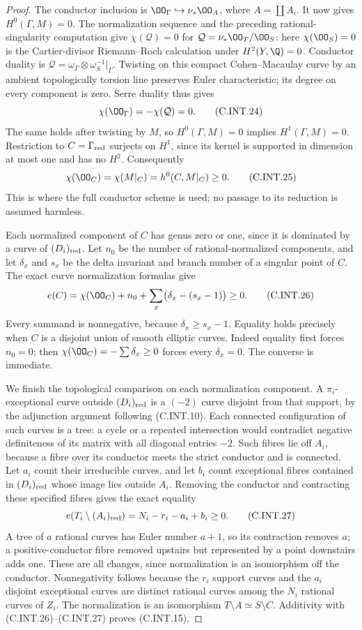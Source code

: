 \begin{proof}
The conductor inclusion is
$\OO_\Gamma\hookrightarrow\nu_*\OO_A$, where
$A=\coprod A_i$. It now gives $H^0(\Gamma,M)=0$.
The normalization sequence and the preceding
rational-singularity computation give
$\chi(\mathcal Q)=0$ for
$\mathcal Q=\nu_*\OO_T/\OO_S$: here
$\chi(\OO_S)=0$ is the Cartier-divisor
Riemann--Roch calculation under $H^2(Y,\Q)=0$.
Conductor duality is
$\mathcal Q=\omega_\Gamma\otimes\omega_S^{-1}|_\Gamma$.
Twisting on this compact Cohen--Macaulay curve by
an ambient topologically torsion line preserves
Euler characteristic; its degree on every
component is zero. Serre duality thus gives
\[
 \chi(\OO_\Gamma)=-\chi(\mathcal Q)=0.
 \tag{C.INT.24}
\]
The same holds after twisting by $M$, so
$H^0(\Gamma,M)=0$ implies $H^1(\Gamma,M)=0$.
Restriction to $C=\Gamma_{\rm red}$ surjects
on $H^1$, since its kernel is supported in
dimension at most one and has no $H^2$.
Consequently
\[
 \chi(\OO_C)=\chi(M|_C)=h^0(C,M|_C)\ge0.
 \tag{C.INT.25}
\]
This is where the full conductor scheme is used;
no passage to its reduction is assumed harmless.

Each normalized component of $C$ has genus zero
or one, since it is dominated by a curve of
$(D_i)_{\rm red}$. Let $n_0$ be the number of
rational-normalized components, and let
$\delta_x$ and $s_x$ be the delta invariant and
branch number of a singular point of $C$.
The exact curve normalization formulas give
\[
 e(C)=\chi(\OO_C)+n_0+
                \sum_x\bigl(\delta_x-(s_x-1)\bigr)\ge0.
 \tag{C.INT.26}
\]
Every summand is nonnegative, because
$\delta_x\ge s_x-1$. Equality holds precisely
when $C$ is a disjoint union of smooth elliptic
curves. Indeed equality first forces $n_0=0$;
then $\chi(\OO_C)=-\sum\delta_x\ge0$
forces every $\delta_x=0$. The converse is immediate.

We finish the topological comparison on each
normalization component. A $\pi_i$-exceptional
curve outside $(D_i)_{\rm red}$ is a $(-2)$ curve
disjoint from that support, by the adjunction
argument following (C.INT.10). Each connected
configuration of such curves is a tree: a cycle
or a repeated intersection would contradict
negative definiteness of its matrix with
all diagonal entries $-2$. Such fibres lie
off $A_i$, because a fibre over its conductor
meets the strict conductor and is connected.
Let $a_i$ count their irreducible curves, and
let $b_i$ count exceptional fibres contained
in $(D_i)_{\rm red}$ whose image lies outside
$A_i$. Removing the conductor and contracting
these specified fibres gives the exact equality
\[
 e(T_i\setminus(A_i)_{\rm red})
       =N_i-r_i-a_i+b_i\ge0.
 \tag{C.INT.27}
\]
A tree of $a$ rational curves has Euler number
$a+1$, so its contraction removes $a$; a
positive-conductor fibre removed upstairs but
represented by a point downstairs adds one.
These are all changes, since normalization is
an isomorphism off the conductor. Nonnegativity
follows because the $r_i$ support curves and
the $a_i$ disjoint exceptional curves are
distinct rational curves among the $N_i$
rational curves of $Z_i$.
The normalization is an isomorphism
$T\setminus A\simeq S\setminus C$. Additivity
with (C.INT.26)--(C.INT.27) proves (C.INT.15).


\end{proof}
